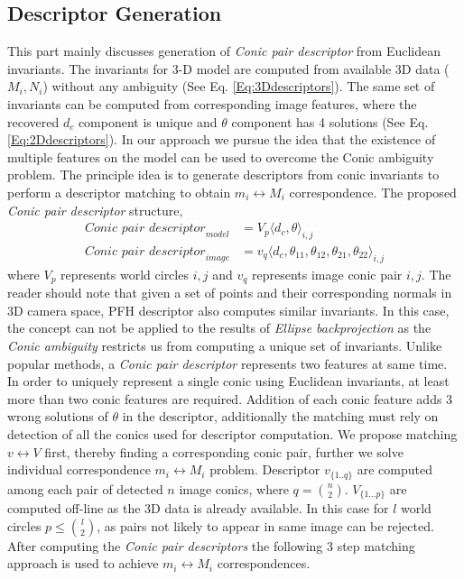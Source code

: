 \documentclass{bmvc2k}
\begin{document}
\subsection{Descriptor Generation}
This part mainly discusses generation of \textit{Conic pair descriptor} from Euclidean invariants. 
The invariants for 3-D model are computed from available 3D data ($M_i,N_i$) without any ambiguity (See Eq. \ref{Eq:3Ddescriptors}). 
The same set of invariants can be computed from corresponding image features, where the recovered $ d_c $ component is unique and $ \theta $ component has 4 solutions (See Eq. \ref{Eq:2Ddescriptors}). 
In our approach we pursue the idea that the existence of multiple features on the model can be used to overcome the Conic ambiguity problem. 
The principle idea is to generate descriptors from conic invariants to perform a descriptor matching to obtain $ m_i \leftrightarrow M_i $ correspondence.
The proposed \textit{Conic pair descriptor} structure,
\begin{align}
\textit{Conic pair descriptor}_{model} &= V_{p} \langle d_c,\theta \rangle_{i,j} \label{Eq:3Ddescriptors} \\
\textit{Conic pair descriptor}_{image} &= v_{q} \langle  d_c,\theta_{11},\theta_{12},\theta_{21},\theta_{22} \rangle_{i,j} \label{Eq:2Ddescriptors} 
\end{align}
where $V_{p}$ represents world circles $i,j$ and $v_{q}$ represents image conic pair $i,j$. 
The reader should note that given a set of points and their corresponding normals in 3D camera space, PFH descriptor \cite{RusuDoctoralDissertation} also computes similar invariants. In this case, the concept can not be applied to the results of \textit{Ellipse backprojection} as the \textit{Conic ambiguity} restricts us from computing a unique set of invariants. 
Unlike popular methods, a \textit{Conic pair descriptor} represents two features at same time. 
In order to uniquely represent a single conic using Euclidean invariants, at least more than two conic features are required. 
Addition of each conic feature adds 3 wrong solutions of $ \theta $ in the descriptor, additionally the matching must rely on detection of all the conics used for descriptor computation. 
We propose matching $ v \leftrightarrow V $ first, thereby finding a corresponding conic pair, further we solve individual correspondence $ m_i \leftrightarrow M_i $ problem. 
Descriptor $ v_{\{1..q\}} $ are computed among each pair of detected $ n $ image conics, where $ q = \binom{n}{2} $. 
$ V_{\{1...p\}} $ are computed off-line as the 3D data is already available. In this case for $ l $ world circles  $ p \leq \binom{l}{2} $, as pairs not likely to appear in same image can be rejected. 
After computing the \textit{Conic pair descriptors} the following 3 step matching approach is used to achieve $ m_i \leftrightarrow M_i $ correspondences. 
\end{document}
